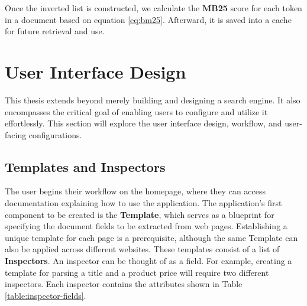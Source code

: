 Once the inverted list is constructed, we calculate the \textbf{MB25} score for each token in a document based on equation \ref{eq:bm25}. Afterward, it is saved into a cache for future retrieval and use.

\section{User Interface Design}\label{sec:ui}
This thesis extends beyond merely building and designing a search engine. It also encompasses the critical goal of enabling users to configure and utilize it effortlessly. This section will explore the user interface design, workflow, and user-facing configurations.

\subsection{Templates and Inspectors}
The user begins their workflow on the homepage, where they can access documentation explaining how to use the application. The application's first component to be created is the \textbf{Template}, which serves as a blueprint for specifying the document fields to be extracted from web pages. Establishing a unique template for each page is a prerequisite, although the same Template can also be applied across different websites. These templates consist of a list of \textbf{Inspectors}. An inspector can be thought of as a field. For example, creating a template for parsing a title and a product price will require two different inspectors. Each inspector contains the attributes shown in Table \ref{table:inspector-fields}.


